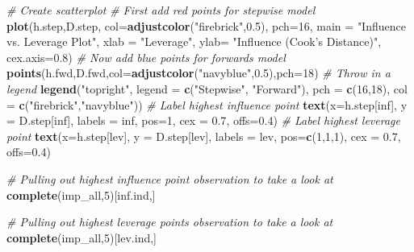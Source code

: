 \documentclass[]{article}
\newenvironment{Shaded}{\begin{snugshade}}{\end{snugshade}}
\newcommand{\KeywordTok}[1]{\textcolor[rgb]{0.13,0.29,0.53}{\textbf{#1}}}
\newcommand{\DataTypeTok}[1]{\textcolor[rgb]{0.13,0.29,0.53}{#1}}
\newcommand{\DecValTok}[1]{\textcolor[rgb]{0.00,0.00,0.81}{#1}}
\newcommand{\FloatTok}[1]{\textcolor[rgb]{0.00,0.00,0.81}{#1}}
\newcommand{\StringTok}[1]{\textcolor[rgb]{0.31,0.60,0.02}{#1}}
\newcommand{\CommentTok}[1]{\textcolor[rgb]{0.56,0.35,0.01}{\textit{#1}}}
\newcommand{\NormalTok}[1]{#1}
\begin{document}
\begin{Shaded}
\begin{Highlighting}[]
\CommentTok{# Create scatterplot}
\CommentTok{# First add red points for stepwise model}
\KeywordTok{plot}\NormalTok{(h.step,D.step, }\DataTypeTok{col=}\KeywordTok{adjustcolor}\NormalTok{(}\StringTok{"firebrick"}\NormalTok{,}\FloatTok{0.5}\NormalTok{), }\DataTypeTok{pch=}\DecValTok{16}\NormalTok{, }
     \DataTypeTok{main =} \StringTok{"Influence vs. Leverage Plot"}\NormalTok{, }\DataTypeTok{xlab =} \StringTok{"Leverage"}\NormalTok{, }
     \DataTypeTok{ylab=} \StringTok{"Influence (Cook's Distance)"}\NormalTok{, }\DataTypeTok{cex.axis=}\FloatTok{0.8}\NormalTok{)}
\CommentTok{# Now add blue points for forwards model}
\KeywordTok{points}\NormalTok{(h.fwd,D.fwd,}\DataTypeTok{col=}\KeywordTok{adjustcolor}\NormalTok{(}\StringTok{"navyblue"}\NormalTok{,}\FloatTok{0.5}\NormalTok{),}\DataTypeTok{pch=}\DecValTok{18}\NormalTok{)}
\CommentTok{# Throw in a legend }
\KeywordTok{legend}\NormalTok{(}\StringTok{"topright"}\NormalTok{, }\DataTypeTok{legend =} \KeywordTok{c}\NormalTok{(}\StringTok{"Stepwise"}\NormalTok{, }\StringTok{"Forward"}\NormalTok{), }\DataTypeTok{pch =} \KeywordTok{c}\NormalTok{(}\DecValTok{16}\NormalTok{,}\DecValTok{18}\NormalTok{),}
       \DataTypeTok{col =} \KeywordTok{c}\NormalTok{(}\StringTok{"firebrick"}\NormalTok{,}\StringTok{"navyblue"}\NormalTok{))}
\CommentTok{# Label highest influence point}
\KeywordTok{text}\NormalTok{(}\DataTypeTok{x=}\NormalTok{h.step[inf], }\DataTypeTok{y =}\NormalTok{ D.step[inf],}
     \DataTypeTok{labels =}\NormalTok{ inf, }\DataTypeTok{pos=}\DecValTok{1}\NormalTok{, }\DataTypeTok{cex =} \FloatTok{0.7}\NormalTok{, }\DataTypeTok{offs=}\FloatTok{0.4}\NormalTok{)}
\CommentTok{# Label highest leverage point}
\KeywordTok{text}\NormalTok{(}\DataTypeTok{x=}\NormalTok{h.step[lev], }\DataTypeTok{y =}\NormalTok{ D.step[lev],}
     \DataTypeTok{labels =}\NormalTok{ lev, }\DataTypeTok{pos=}\KeywordTok{c}\NormalTok{(}\DecValTok{1}\NormalTok{,}\DecValTok{1}\NormalTok{,}\DecValTok{1}\NormalTok{), }\DataTypeTok{cex =} \FloatTok{0.7}\NormalTok{, }\DataTypeTok{offs=}\FloatTok{0.4}\NormalTok{)}

\CommentTok{# Pulling out highest influence point observation to take a look at }
\KeywordTok{complete}\NormalTok{(imp_all,}\DecValTok{5}\NormalTok{)[inf.ind,]}

\CommentTok{# Pulling out highest leverage points observation to take a look at }
\KeywordTok{complete}\NormalTok{(imp_all,}\DecValTok{5}\NormalTok{)[lev.ind,]}
\end{Highlighting}
\end{Shaded}
\end{document}
